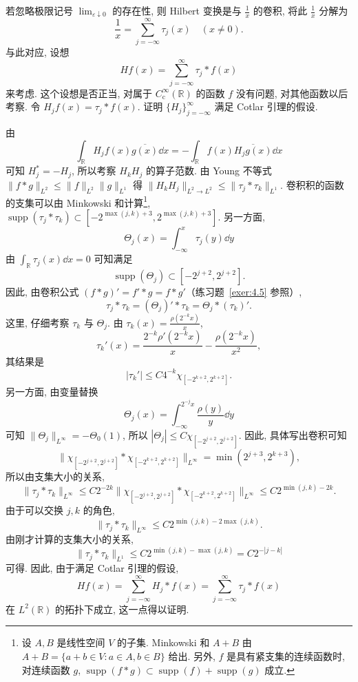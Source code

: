 若忽略极限记号 $\lim_{\varepsilon \downarrow 0}$ 的存在性, 则 Hilbert 变换是与 $\frac{1}{x}$ 的卷积, 将此 $\frac{1}{x}$ 分解为
\[
\frac{1}{x} = \sum_{j=-\infty}^{\infty}\tau_{j}(x) \quad (x \neq 0).
\]
与此对应, 设想
\begin{equation}\tag{4.8}
Hf(x) = \sum_{j=-\infty}^{\infty}\tau_{j} * f(x)
\label{eq:4.8}
\end{equation}
来考虑. 这个设想是否正当, 对属于 $C_{\mathrm{c}}^{\infty}(\mathbb{R})$ 的函数 $f$ 没有问题, 对其他函数以后考察. 令 $H_{j}f(x) = \tau_{j} * f(x)$. 证明 $\{H_{j}\}_{j=-\infty}^{\infty}$ 满足 Cotlar 引理的假设.

由
\[
\int_{\mathbb{R}}H_{j}f(x)\overline{g(x)}\dd x = -\int_{\mathbb{R}}f(x)\overline{H_{j}g(x)}\dd x
\]
可知 $H_{j}^{*} = -H_{j}$, 所以考察 $H_{k}H_{j}$ 的算子范数. 由 Young 不等式 $\|f * g\|_{L^{2}} \leq \|f\|_{L^{2}}\|g\|_{L^{1}}$ 得 $\|H_{k}H_{j}\|_{L^{2} \to L^{2}} \leq \|\tau_{j} * \tau_{k}\|_{L^{1}}$. 卷积积的函数的支集可以由 Minkowski 和计算\footnote{设 $A, B$ 是线性空间 $V$ 的子集. Minkowski 和 $A+B$ 由 $A+B = \{a+b \in V : a \in A, b \in B\}$ 给出. 另外, $f$ 是具有紧支集的连续函数时, 对连续函数 $g$, $\operatorname{supp}(f * g) \subset \operatorname{supp}(f) + \operatorname{supp}(g)$ 成立.}, $\operatorname{supp}(\tau_{j} * \tau_{k}) \subset [-2^{\max(j,k)+3}, 2^{\max(j,k)+3}]$. 另一方面,
\[
\Theta_{j}(x) = \int_{-\infty}^{x}\tau_{j}(y)\dd y
\]
由 $\int_{\mathbb{R}}\tau_{j}(x)\dd x = 0$ 可知满足
\[
\operatorname{supp}(\Theta_{j}) \subset [-2^{j+2}, 2^{j+2}].
\]
因此, 由卷积公式 $(f * g)' = f' * g = f * g'$（练习题~\ref{exer:4.5} 参照）,
\[
\tau_{j} * \tau_{k} = (\Theta_{j})' * \tau_{k} = \Theta_{j} * (\tau_{k})'.
\]
这里, 仔细考察 $\tau_{k}$ 与 $\Theta_{j}$. 由 $\tau_{k}(x) = \frac{\rho(2^{-k}x)}{x}$,
\[
\tau_{k}'(x) = \frac{2^{-k}\rho'(2^{-k}x)}{x} - \frac{\rho(2^{-k}x)}{x^{2}},
\]
其结果是
\[
|\tau_{k}'| \leq C4^{-k}\chi_{[-2^{k+2}, 2^{k+2}]}.
\]
另一方面, 由变量替换
\[
\Theta_{j}(x) = \int_{-\infty}^{2^{-j}x}\frac{\rho(y)}{y}\dd y
\]
可知 $\|\Theta_{j}\|_{L^{\infty}} = -\Theta_{0}(1)$, 所以 $|\Theta_{j}| \leq C\chi_{[-2^{j+2}, 2^{j+2}]}$. 因此, 具体写出卷积可知
\[
\|\chi_{[-2^{j+2}, 2^{j+2}]} * \chi_{[-2^{k+2}, 2^{k+2}]}\|_{L^{\infty}} = \min(2^{j+3}, 2^{k+3}),
\]
所以由支集大小的关系,
\[
\|\tau_{j} * \tau_{k}\|_{L^{\infty}} \leq C2^{-2k}\|\chi_{[-2^{j+2}, 2^{j+2}]} * \chi_{[-2^{k+2}, 2^{k+2}]}\|_{L^{\infty}} \leq C2^{\min(j,k)-2k}.
\]
由于可以交换 $j, k$ 的角色,
\[
\|\tau_{j} * \tau_{k}\|_{L^{\infty}} \leq C2^{\min(j,k)-2\max(j,k)}.
\]
由刚才计算的支集大小的关系,
\[
\|\tau_{j} * \tau_{k}\|_{L^{1}} \leq C2^{\min(j,k)-\max(j,k)} = C2^{-|j-k|}
\]
可得. 因此, 由于满足 Cotlar 引理的假设,
\[
Hf(x) = \sum_{j=-\infty}^{\infty}H_{j} * f(x) = \sum_{j=-\infty}^{\infty}\tau_{j} * f(x)
\]
在 $L^{2}(\mathbb{R})$ 的拓扑下成立, 这一点得以证明.

